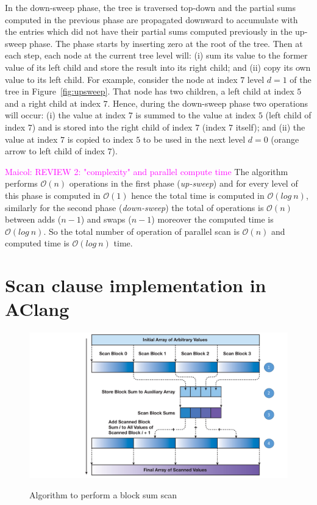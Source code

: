 \documentclass[Ingles]{ic-tese-v1}
\newcommand{\maicol}[1]{\noindent\textcolor{magenta}{Maicol: {#1}}}
\newcommand{\maicol}[1]{}
\newcommand{\rfig}[1]{Figure~\ref{fig:#1}}
\begin{document}
In  the down-sweep  phase,  the  tree is  traversed  top-down and  the
partial sums computed in the previous phase are propagated downward to
accumulate  with the  entries which  did not  have their  partial sums
computed  previously  in the  up-sweep  phase.   The phase  starts  by
inserting zero at the  root of the tree. Then at  each step, each node
at the current tree level will: (i)  sum its value to the former value
of its left child and store the  result into its right child; and (ii)
copy its own value to its  left child.  For example, consider the node
at index $7$  level $d = 1$  of the tree in  \rfig{upsweep}. That node
has two children, a left child at index $5$ and a right child at index
$7$.  Hence,  during the down-sweep  phase two operations  will occur:
(i) the value at  index $7$ is summed to the value  at index $5$ (left
child of index  $7$) and is stored  into the right child  of index $7$
(index $7$ itself); and (ii) the value at index $7$ is copied to index
$5$ to be used  in the next level $d = 0$ (orange  arrow to left child
of index $7$).

\maicol{REVIEW 2: "complexity" and parallel compute time}
The algorithm  performs $\mathcal{O}(n)$ operations in the first
phase (\textit{up-sweep}) and for every level of this phase is computed in $\mathcal{O}(1)$ hence
the total time is computed in $\mathcal{O}(log\ n)$, similarly for the second phase
(\textit{down-sweep}) the total of operations is $\mathcal{O}(n)$ between adds ($n-1$)
and swaps ($n-1$) moreover the computed time is $\mathcal{O}(log\ n)$.
So the total number of operation of parallel scan
is $\mathcal{O}(n)$ and computed time is
$\mathcal{O}(log\ n)$ time.	


\section{Scan clause implementation in AClang}
\label{sec:ScanInAClang}

\begin{figure}[t]
	\centering
	\caption{Algorithm to perform a block sum scan}
	\includegraphics[scale=0.35]{images/phaseScan.pdf}
	\label{fig:scheme}
\end{figure}
\end{document}
